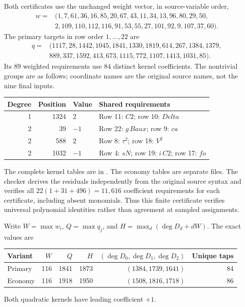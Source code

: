 Both certificates use the unchanged weight vector, in source-variable order,
\[
\begin{split}
w={}&(1,7,61,36,16,85,20,67,43,11,34,13,96,80,29,50,\\
 &2,109,110,112,116,91,53,55,27,101,92,9,107,37,60).
\end{split}
\]
The primary targets in row order $1,\ldots,22$ are
\[
\begin{split}
q={}&(1117,28,1442,1045,1841,1330,1819,614,267,1384,1379,\\
 &889,337,1592,413,673,1115,772,1107,1413,1031,85).
\end{split}
\]
Its $89$ weighted requirements use $84$ distinct kernel coefficients. The
nontrivial groups are as follows; coordinate names are the original source
names, not the nine final inputs.
\begin{center}
\begin{tabular}{rrlp{5.4cm}}
\toprule
Degree&Position&Value&Shared requirements\\
\midrule
1&1324&$2$&Row 11: $C2$; row 10: $\mathit{Delta}$\\
2&39&$-1$&Row 22: $g\,\mathit{Baux}$; row 9: $ca$\\
2&588&$2$&Row 8: $\tau^2$; row 18: $V^2$\\
2&1032&$-1$&Row 4: $sN$; row 19: $i\,C2$; row 17: $fo$\\
\bottomrule
\end{tabular}
\end{center}
The complete kernel tables are in .
The economy tables are separate files.
The checker derives the residuals independently from the original source
syntax and verifies all
$22(1+31+496)=11{,}616$ coefficient requirements for each certificate,
including absent monomials. Thus this finite certificate verifies universal
polynomial identities rather than agreement at sampled assignments.

Write $W=\max w_i$, $Q=\max q_j$, and
$H=\max_d(\deg D_d+dW)$. The exact values are
\begin{center}
\begin{tabular}{lrrrrr}
\toprule
Variant&$W$&$Q$&$H$&$(\deg D_0,\deg D_1,\deg D_2)$&Unique taps\\
\midrule
Primary&116&1841&1873&$(1384,1739,1641)$&84\\
Economy&116&1918&1950&$(1508,1816,1718)$&86\\
\bottomrule
\end{tabular}
\end{center}
Both quadratic kernels have leading coefficient $+1$.


